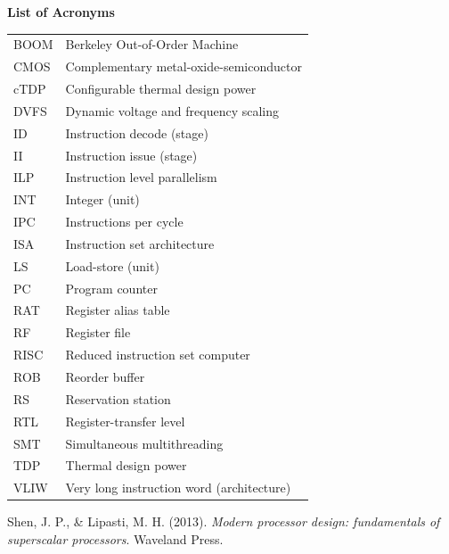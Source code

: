 \documentclass[12pt,a4paper]{article} %
\begin{document}
\cleardoublepage
{}
{}
\label{sec-lof}
\listoffigures

\newpage

\cleardoublepage
{}
{}
\label{sec-loa}
{\textbf{\Large List of Acronyms}\\
	
	{
		\setlength{\extrarowheight}{10pt}
		\hfill \break
		\begin{tabularx} {\textwidth} {p{5cm} X}
			BOOM & Berkeley Out-of-Order Machine\\
			CMOS & Complementary metal-oxide-semiconductor\\
			cTDP & Configurable thermal design power\\ 
			DVFS & Dynamic voltage and frequency scaling\\
			ID   & Instruction decode (stage)\\
			II   & Instruction issue (stage)\\
			ILP  & Instruction level parallelism\\
			INT  & Integer (unit)\\
			IPC  & Instructions per cycle\\
			ISA  & Instruction set architecture\\
			LS	 & Load-store (unit)\\
			PC	 & Program counter\\
			RAT  & Register alias table\\ 	
			RF	 & Register file\\        
			RISC & Reduced instruction set computer\\
			ROB  & Reorder buffer\\     
			RS	 & Reservation station\\  
			RTL	 & Register-transfer level\\ 
			SMT	 & Simultaneous multithreading\\
			TDP	 & Thermal design power\\	
			VLIW & Very long instruction word (architecture)\\
			
		\end{tabularx}
		\hfill \break
		\newpage
	}


\newpage 
\thispagestyle{empty}
\begin{thebibliography}{56} %
    
    Shen, J. P., \& Lipasti, M. H. (2013). \textit{Modern processor design: fundamentals of superscalar processors}. Waveland Press.   
    

\end{thebibliography}}
\end{document}
